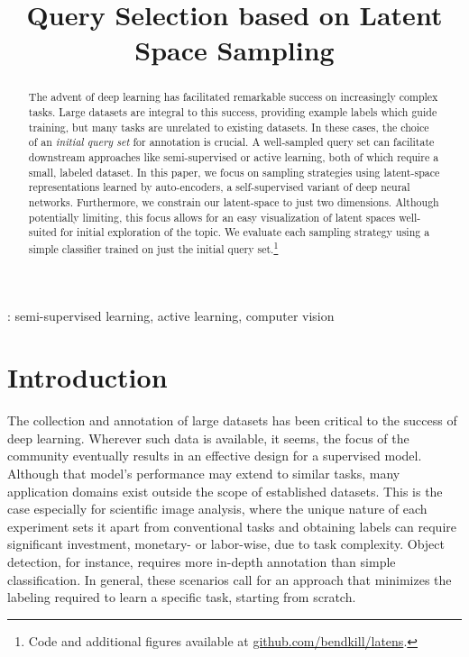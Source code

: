 \documentclass[a4paper]{article}
\title{Query Selection based on Latent Space Sampling}
\begin{document}
\maketitle

\begin{abstract}
  The advent of deep learning has facilitated remarkable success on increasingly
  complex tasks. Large datasets are integral to this success, providing example
  labels which guide training, but many tasks are unrelated to existing
  datasets. In these cases, the choice of an \emph{initial query set} for
  annotation is crucial. A well-sampled query set can facilitate downstream
  approaches like semi-supervised or active learning, both of which require a
  small, labeled dataset. In this paper, we focus on sampling strategies using
  latent-space representations learned by auto-encoders, a self-supervised
  variant of deep neural networks. Furthermore, we constrain our latent-space to
  just two dimensions. Although potentially limiting, this focus allows for an
  easy visualization of latent spaces well-suited for initial exploration of the
  topic. We evaluate each sampling strategy using a simple classifier trained on
  just the initial query set.\footnote{Code and additional figures available at
    \href{https://github.com/bendkill/latens}{github.com/bendkill/latens}.}
\end{abstract}
: semi-supervised learning, active learning, computer
vision

\section{Introduction}
\label{sec:introduction}

The collection and annotation of large datasets has been critical to the success
of deep learning. Wherever such data is available, it seems, the focus of the
community eventually results in an effective design for a supervised
model. Although that model's performance may extend to similar tasks, many
application domains exist outside the scope of established datasets. This is the
case especially for scientific image analysis, where the unique nature of each
experiment sets it apart from conventional tasks and obtaining labels can
require significant investment, monetary- or labor-wise, due to task
complexity. Object detection, for instance, requires more in-depth annotation
than simple classification. In general, these scenarios call for an approach
that minimizes the labeling required to learn a specific task, starting from
scratch.
\end{document}
